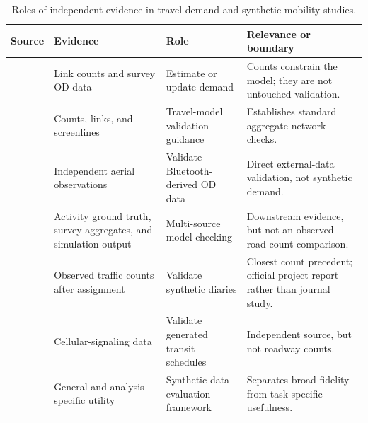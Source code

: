 \begin{table}[!htbp]
\caption{Roles of independent evidence in travel-demand and synthetic-mobility studies.}
\label{tab:literature_external}
\centering
\setlength{\tabcolsep}{3.0pt}
\begin{tabularx}{\textwidth}{P{0.18\textwidth} P{0.25\textwidth} Y Y}
\toprule
\textbf{Source} & \textbf{Evidence} & \textbf{Role} & \textbf{Relevance or boundary} \\
\midrule
\cite{vanzuylen1980counts,cascetta1984gls} & Link counts and survey OD data & Estimate or update demand & Counts constrain the model; they are not untouched validation. \\
\cite{fhwa2010validation} & Counts, links, and screenlines & Travel-model validation guidance & Establishes standard aggregate network checks. \\
\cite{chitturi2014odvalidation} & Independent aerial observations & Validate Bluetooth-derived OD data & Direct external-data validation, not synthetic demand. \\
\cite{yin2018activities} & Activity ground truth, survey aggregates, and simulation output & Multi-source model checking & Downstream evidence, but not an observed road-count comparison. \\
\cite{kressner2017nchrp} & Observed traffic counts after assignment & Validate synthetic diaries & Closest count precedent; official project report rather than journal study. \\
\cite{vo2026harnessing} & Cellular-signaling data & Validate generated transit schedules & Independent source, but not roadway counts. \\
\cite{snoke2018utility} & General and analysis-specific utility & Synthetic-data evaluation framework & Separates broad fidelity from task-specific usefulness. \\
\bottomrule
\end{tabularx}
\end{table}
